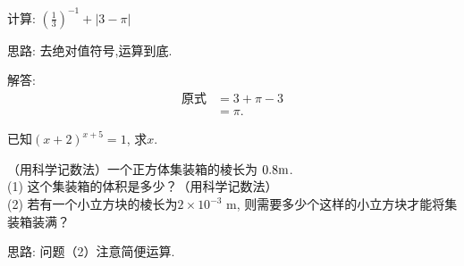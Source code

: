 \item{
    计算: $ (\frac{1}{3})^{-1} + \lvert 3-\pi \rvert $
    
    \fangsong{}
    思路: 去绝对值符号,运算到底.

    解答: 
    \begin{align*}
        \mbox{原式} &= 3 + \pi - 3\\
        &= \pi.
    \end{align*}
}
\item{
    已知$(x+2)^{x+5}=1$, 求$x$.
}
\item{
    （用科学记数法）一个正方体集装箱的棱长为 $0.8 \rm{m}$.\\
    (1) 这个集装箱的体积是多少？（用科学记数法）\\
    (2) 若有一个小立方块的棱长为$2\times 10^{-3} $ m, 则需要多少个这样的小立方块才能将集装箱装满？

    \fangsong{}
    思路: 问题（2）注意简便运算.
}
